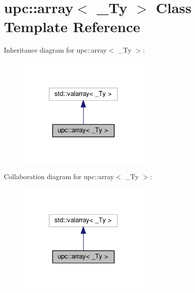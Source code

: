\hypertarget{classupc_1_1array}{}\section{upc\+:\+:array$<$ \+\_\+\+Ty $>$ Class Template Reference}
\label{classupc_1_1array}


Inheritance diagram for upc\+:\+:array$<$ \+\_\+\+Ty $>$\+:
\nopagebreak
\begin{figure}[H]
\begin{center}
\leavevmode
\includegraphics[width=185pt]{classupc_1_1array__inherit__graph}
\end{center}
\end{figure}


Collaboration diagram for upc\+:\+:array$<$ \+\_\+\+Ty $>$\+:
\nopagebreak
\begin{figure}[H]
\begin{center}
\leavevmode
\includegraphics[width=185pt]{classupc_1_1array__coll__graph}
\end{center}
\end{figure}
